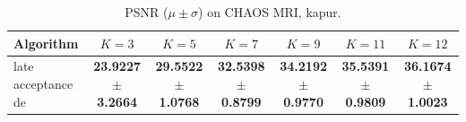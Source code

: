 \begin{table}[htbp]
\centering
\caption{PSNR ($\mu \pm \sigma$) on CHAOS MRI, kapur.}
\label{tab:exp2-kapur-psnr}
\begin{tabular}{lcccccc}
\toprule
Algorithm & $K=3$ & $K=5$ & $K=7$ & $K=9$ & $K=11$ & $K=12$ \\
\midrule
late acceptance de & \textbf{23.9227 $\pm$ 3.2664} & \textbf{29.5522 $\pm$ 1.0768} & \textbf{32.5398 $\pm$ 0.8799} & \textbf{34.2192 $\pm$ 0.9770} & \textbf{35.5391 $\pm$ 0.9809} & \textbf{36.1674 $\pm$ 1.0023} \\
\bottomrule
\end{tabular}
\end{table}